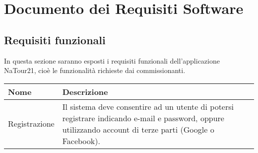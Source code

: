 \documentclass{natourDoc}
\begin{document}
\section{Documento dei Requisiti Software}
	\subsection{Requisiti funzionali}
	In questa sezione saranno esposti i requisiti funzionali dell'applicazione NaTour21, cioè le funzionalità richieste dai commissionanti.

	\begin{center}
		\begin{tabular}{ |p{5cm}|p{10.3cm}| } 
		 \hline
		 \rowcolor{PineGreen!70}
		 \textbf{Nome} & \textbf{Descrizione} \\
		 \hline
		  Registrazione & Il sistema deve consentire ad un utente di potersi registrare indicando e-mail e password, oppure utilizzando account di terze parti (Google o Facebook).\\ 
		 \hline
		\end{tabular}
		\end{center}
\end{document}
